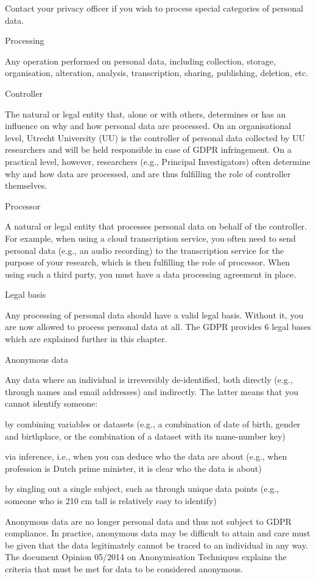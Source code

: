 \documentclass[
]{book}
\begin{document}
Contact your privacy officer
if you wish to process special categories of personal data.

Processing

Any operation performed on personal data, including collection, storage, organisation,
alteration, analysis, transcription, sharing, publishing, deletion, etc.

Controller

The natural or legal entity that, alone or with others, determines or has an influence on why
and how personal data are processed. On an organisational level, Utrecht University (UU)
is the controller of personal data collected by UU researchers and will be held responsible
in case of GDPR infringement. On a practical level, however, researchers (e.g., Principal Investigators)
often determine why and how data are processed, and are thus fulfilling the role of controller themselves.

Processor

A natural or legal entity that processes personal data on behalf of the controller. For example,
when using a cloud transcription service, you often need to send personal data (e.g., an audio recording)
to the transcription service for the purpose of your research, which is then fulfilling the role
of processor. When using such a third party, you must have a
data processing agreement in place.

Legal basis

Any processing of personal data should have a valid legal basis. Without it, you are now allowed to
process personal data at all. The GDPR provides 6 legal bases which are explained further
in this chapter.

Anonymous data

Any data where an individual is irreversibly de-identified, both directly (e.g., through names and
email addresses) and indirectly. The latter means that you cannot identify someone:

by combining variables or datasets (e.g., a combination of date of birth, gender and birthplace,
or the combination of a dataset with its name-number key)

via inference, i.e., when you can deduce who the data are about (e.g., when profession is
Dutch prime minister, it is clear who the data is about)

by singling out a single subject, such as through unique data points (e.g., someone who is
210 cm tall is relatively easy to identify)

Anonymous data are no longer personal data and thus not subject to GDPR compliance. In practice,
anonymous data may be difficult to attain and care must be given that the data legitimately cannot
be traced to an individual in any way. The document
Opinion 05/2014 on Anonymisation Techniques
explains the criteria that must be met for data to be considered anonymous.
\end{document}
